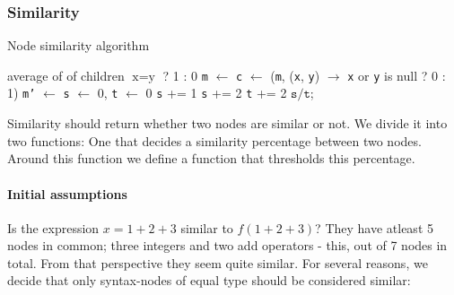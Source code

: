\documentclass[11pt]{article}
\begin{document}
\subsubsection{Similarity}
\label{FunctionSimilarity}

\begin{algorithm}
  \caption{Node similarity algorithm}
  \label{SimilarityAlgorithm}
\begin{algorithmic}
		\State {}
		\State \Return average of  of children
		\State \Return $ \text{x} = \text{y}$ ? 1 : 0
		\State \texttt{m} $\gets$ 
		\State \texttt{c} $\gets$  (\texttt{m}, (\texttt{x}, \texttt{y}) $\rightarrow$ \texttt{x} or \texttt{y} is null ? 0 : 1)
		\State \Return {}
		\State \texttt{m'} $\gets$ 
		\State \texttt{s} $\gets$ 0, \texttt{t} $\gets$ 0
				\State \texttt{s} += 1
			\Else
				\State \texttt{s} += 2
				\State \texttt{t} += 2
			\EndIf
		\EndFor
		\State \Return $ \texttt{s} / \texttt{t} $;
	\EndIf
\EndFunction
\end{algorithmic}
\end{algorithm}


Similarity should return whether two nodes are similar or not. We divide it into two functions:  One that decides a similarity percentage between two nodes. Around this function we define a function that thresholds this percentage.

\paragraph{Initial assumptions} Is the expression $x=1+2+3$ similar to $f(1+2+3)$? They have atleast 5 nodes in common; three integers and two add operators - this, out of 7 nodes in total. From that perspective they seem quite similar. For several reasons, we decide that only syntax-nodes of equal type should be considered similar:
\end{document}
